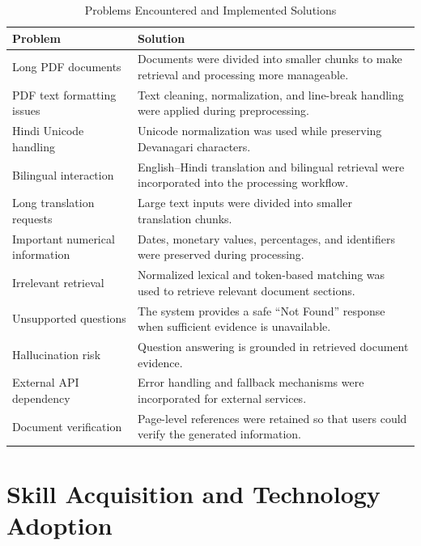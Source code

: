 \begin{table}[H]
\centering
\caption{Problems Encountered and Implemented Solutions}
\label{tab:problems}

\renewcommand{\arraystretch}{1.25}
\setlength{\tabcolsep}{4pt}

\begin{tabular}{|
>{\raggedright\arraybackslash}p{4.2cm}|
>{\raggedright\arraybackslash}p{8.8cm}|}

\hline
\textbf{Problem} &
\textbf{Solution}
\\
\hline
Long PDF documents &
Documents were divided into smaller chunks to make retrieval and
processing more manageable.
\\
\hline
PDF text formatting issues &
Text cleaning, normalization, and line-break handling were applied
during preprocessing.
\\
\hline
Hindi Unicode handling &
Unicode normalization was used while preserving Devanagari
characters.
\\
\hline
Bilingual interaction &
English--Hindi translation and bilingual retrieval were incorporated
into the processing workflow.
\\
\hline
Long translation requests &
Large text inputs were divided into smaller translation chunks.
\\
\hline
Important numerical information &
Dates, monetary values, percentages, and identifiers were preserved
during processing.
\\
\hline
Irrelevant retrieval &
Normalized lexical and token-based matching was used to retrieve
relevant document sections.
\\
\hline
Unsupported questions &
The system provides a safe ``Not Found'' response when sufficient
evidence is unavailable.
\\
\hline
Hallucination risk &
Question answering is grounded in retrieved document evidence.
\\
\hline
External API dependency &
Error handling and fallback mechanisms were incorporated for
external services.
\\
\hline
Document verification &
Page-level references were retained so that users could verify the
generated information.
\\
\hline
\end{tabular}
\end{table}

\section{Skill Acquisition and Technology Adoption}

